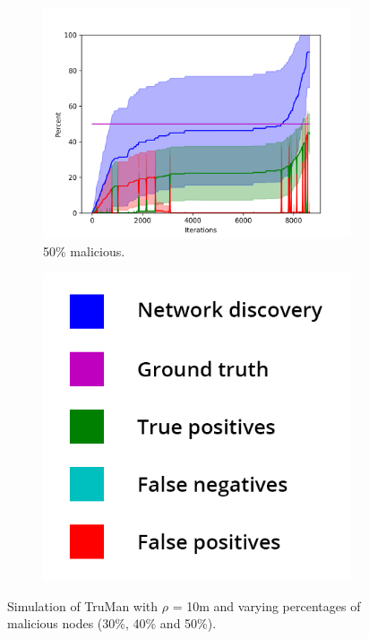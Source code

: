 \begin{figure}
\begin{subfigure}{0.5\textwidth}
\includegraphics[width=\linewidth]{images/plots/Network_rA/10_50.png}
\caption{50\% malicious.}
\end{subfigure}
\hspace*{\fill} %
\begin{subfigure}{0.3\textwidth}
\includegraphics[width=\linewidth]{images/legend2.png}
\end{subfigure}

\caption{Simulation of TruMan with $\rho$ = 10m and varying percentages of malicious nodes (30\%, 40\% and 50\%).}
\label{fig:randommalicious2}
\end{figure}

